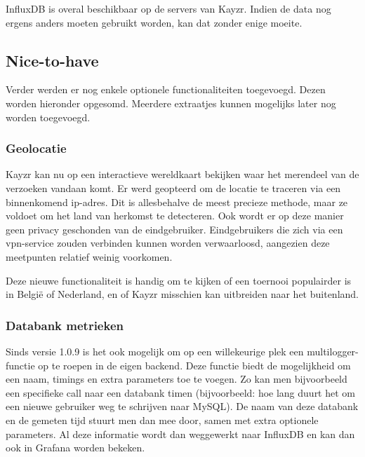 InfluxDB is overal beschikbaar op de servers van Kayzr. Indien de data nog ergens anders moeten gebruikt worden, kan dat zonder enige moeite.

\subsection{Nice-to-have}
\label{sec:nicetohave}

Verder werden er nog enkele optionele functionaliteiten toegevoegd. Dezen worden hieronder opgesomd. Meerdere extraatjes kunnen mogelijks later nog worden toegevoegd.
\pagebreak
\subsubsection{Geolocatie}
\label{sec:geolocation}

Kayzr kan nu op een interactieve wereldkaart bekijken waar het merendeel van de verzoeken vandaan komt. Er werd geopteerd om de locatie te traceren via een binnenkomend ip-adres. Dit is allesbehalve de meest precieze methode, maar ze voldoet om het land van herkomst te detecteren. Ook wordt er op deze manier geen privacy geschonden van de eindgebruiker. Eindgebruikers die zich via een vpn-service zouden verbinden kunnen worden verwaarloosd, aangezien deze meetpunten relatief weinig voorkomen.

Deze nieuwe functionaliteit is handig om te kijken of een toernooi populairder is in België of Nederland, en of Kayzr misschien kan uitbreiden naar het buitenland.

\subsubsection{Databank metrieken}
\label{sec:databaseMetrics}

Sinds versie 1.0.9 is het ook mogelijk om op een willekeurige plek een multilogger-functie op te roepen in de eigen backend. Deze functie biedt de mogelijkheid om een naam, timings en extra parameters toe te voegen. Zo kan men bijvoorbeeld een specifieke call naar een databank timen (bijvoorbeeld: hoe lang duurt het om een nieuwe gebruiker weg te schrijven naar MySQL). De naam van deze databank en de gemeten tijd stuurt men dan mee door, samen met extra optionele parameters. Al deze informatie wordt dan weggewerkt naar InfluxDB en kan dan ook in Grafana worden bekeken. 

